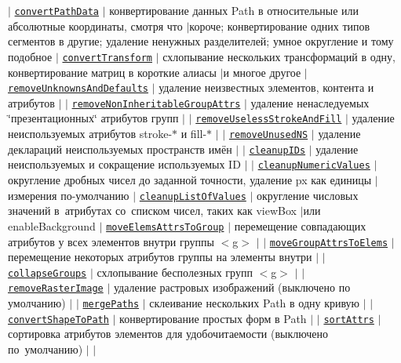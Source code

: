 $\vert$ \href{https://github.com/svg/svgo/blob/master/plugins/convertPathData.js}{\tt convert\+Path\+Data} $\vert$ конвертирование данных Path в относительные или абсолютные координаты, смотря что $\vert$короче; конвертирование одних типов сегментов в другие; удаление ненужных разделителей; умное округление и тому подобное $\vert$ \href{https://github.com/svg/svgo/blob/master/plugins/convertTransform.js}{\tt convert\+Transform} $\vert$ схлопывание нескольких трансформаций в одну, конвертирование матриц в короткие алиасы $\vert$и многое другое $\vert$ \href{https://github.com/svg/svgo/blob/master/plugins/removeUnknownsAndDefaults.js}{\tt remove\+Unknowns\+And\+Defaults} $\vert$ удаление неизвестных элементов, контента и атрибутов $\vert$ $\vert$ \href{https://github.com/svg/svgo/blob/master/plugins/removeNonInheritableGroupAttrs.js}{\tt remove\+Non\+Inheritable\+Group\+Attrs} $\vert$ удаление ненаследуемых \char`\"{}презентационных\char`\"{} атрибутов групп $\vert$ $\vert$ \href{https://github.com/svg/svgo/blob/master/plugins/removeUselessStrokeAndFill.js}{\tt remove\+Useless\+Stroke\+And\+Fill} $\vert$ удаление неиспользуемых атрибутов stroke-\/$\ast$ и fill-\/$\ast$ $\vert$ $\vert$ \href{https://github.com/svg/svgo/blob/master/plugins/removeUnusedNS.js}{\tt remove\+Unused\+NS} $\vert$ удаление деклараций неиспользуемых пространств имён $\vert$ $\vert$ \href{https://github.com/svg/svgo/blob/master/plugins/cleanupIDs.js}{\tt cleanup\+I\+Ds} $\vert$ удаление неиспользуемых и сокращение используемых ID $\vert$ $\vert$ \href{https://github.com/svg/svgo/blob/master/plugins/cleanupNumericValues.js}{\tt cleanup\+Numeric\+Values} $\vert$ округление дробных чисел до заданной точности, удаление {\ttfamily px} как единицы $\vert$измерения по-\/умолчанию $\vert$ \href{https://github.com/svg/svgo/blob/master/plugins/cleanupListOfValues.js}{\tt cleanup\+List\+Of\+Values} $\vert$ округление числовых значений в атрибутах со списком чисел, таких как {\ttfamily view\+Box} $\vert$или {\ttfamily enable\+Background} $\vert$ \href{https://github.com/svg/svgo/blob/master/plugins/moveElemsAttrsToGroup.js}{\tt move\+Elems\+Attrs\+To\+Group} $\vert$ перемещение совпадающих атрибутов у всех элементов внутри группы {\ttfamily $<$g$>$} $\vert$ $\vert$ \href{https://github.com/svg/svgo/blob/master/plugins/moveGroupAttrsToElems.js}{\tt move\+Group\+Attrs\+To\+Elems} $\vert$ перемещение некоторых атрибутов группы на элементы внутри $\vert$ $\vert$ \href{https://github.com/svg/svgo/blob/master/plugins/collapseGroups.js}{\tt collapse\+Groups} $\vert$ схлопывание бесполезных групп {\ttfamily $<$g$>$} $\vert$ $\vert$ \href{https://github.com/svg/svgo/blob/master/plugins/removeRasterImages.js}{\tt remove\+Raster\+Image} $\vert$ удаление растровых изображений (выключено по умолчанию) $\vert$ $\vert$ \href{https://github.com/svg/svgo/blob/master/plugins/mergePaths.js}{\tt merge\+Paths} $\vert$ склеивание нескольких Path в одну кривую $\vert$ $\vert$ \href{https://github.com/svg/svgo/blob/master/plugins/convertShapeToPath.js}{\tt convert\+Shape\+To\+Path} $\vert$ конвертирование простых форм в Path $\vert$ $\vert$ \href{https://github.com/svg/svgo/blob/master/plugins/sortAttrs.js}{\tt sort\+Attrs} $\vert$ сортировка атрибутов элементов для удобочитаемости (выключено по умолчанию) $\vert$ $\vert$ 